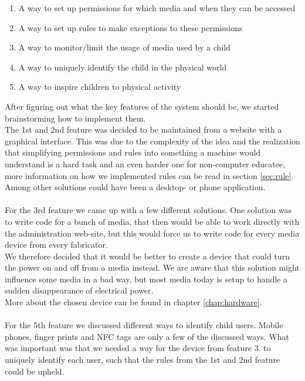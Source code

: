 \begin{enumerate}
	\item A way to set up permissions for which media and when they can be accessed
	\item A way to set up rules to make exceptions to these permissions
	\item A way to monitor/limit the usage of media used by a child
	\item A way to uniquely identify the child in the physical world
	\item A way to inspire children to physical activity
\end{enumerate}

After figuring out what the key features of the system should be, we started brainstorming how to implement them.\\
The 1st and 2nd feature was decided to be maintained from a website with a graphical interface. This was due to the complexity of the idea and the realization that simplifying permissions and rules into something a machine would understand is a hard task and an even harder one for non-computer educatee, more information on how we implemented rules can be read in section \vref{sec:rule}.\\
Among other solutions could have been a desktop- or phone application.\\
\\
For the 3rd feature  we came up with a few different solutions. One solution was to write code for a bunch of media, that then would be able to work directly with the administration web-site, but this would force us to write code for every media device from every fabricator.\\
We therefore decided that it would be better to create a device that could turn the power on and off from a media instead. We are aware that this solution might influence some media in a bad way, but most media today is setup to handle a sudden disappearance of electrical power.\\
More about the chosen device can be found in chapter \vref{chap:hardware}.\\
\\
For the 5th feature  we discussed different ways to identify child users. Mobile phones, finger prints and NFC tags are only a few of the discussed ways. What was important was that we needed a way for the device from feature 3. to uniquely identify each user, such that the rules from the 1st and 2nd feature could be upheld.\\
